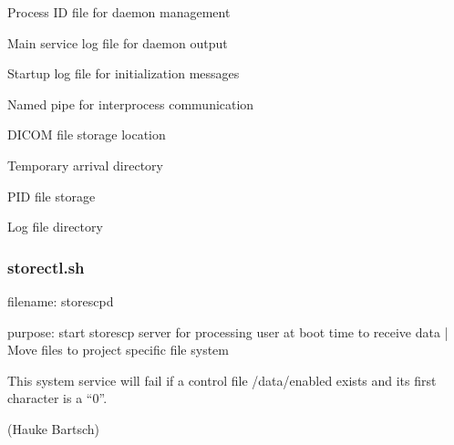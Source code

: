 \documentclass[letterpaper,10pt,english]{sphinxmanual}
\begin{document}
\begin{DUlineblock}{0em}
\item[] \sphinxhyphen{}  \sphinxhyphen{} Process ID file for daemon management
\item[] \sphinxhyphen{}  \sphinxhyphen{} Main service log file for daemon output
\item[] \sphinxhyphen{}  \sphinxhyphen{} Startup log file for initialization messages
\item[] \sphinxhyphen{}  \sphinxhyphen{} Named pipe for inter\sphinxhyphen{}process communication
\end{DUlineblock}

\sphinxAtStartPar
{}

\begin{DUlineblock}{0em}
\item[] \sphinxhyphen{}  \sphinxhyphen{} DICOM file storage location
\item[] \sphinxhyphen{}  \sphinxhyphen{} Temporary arrival directory
\item[] \sphinxhyphen{}  \sphinxhyphen{} PID file storage
\item[] \sphinxhyphen{}  \sphinxhyphen{} Log file directory
\end{DUlineblock}


\subsubsection{storectl.sh}
\label{\detokenize{Architecture/scripts/storectl:id1}}
\sphinxAtStartPar
filename: storescpd

\sphinxAtStartPar
purpose: start storescp server for processing user at boot time to receive data
|         Move files to project specific file system

\sphinxAtStartPar
This system service will fail if a control file /data/enabled exists and  its first character is a “0”.

\sphinxAtStartPar
(Hauke Bartsch)
\end{document}

